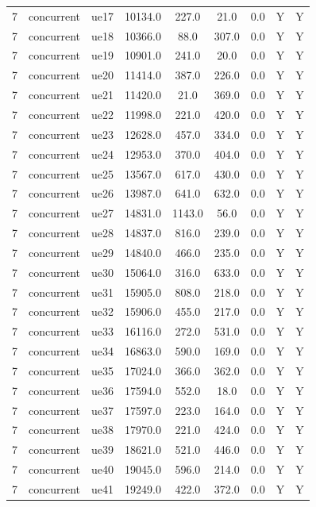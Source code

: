 \begin{table}[ht]
\begin{tabular}{|c|c|c|c|c|c|c|c|c|}
7 & concurrent & ue17 & 10134.0 & 227.0 & 21.0 & 0.0 & Y & Y \\
7 & concurrent & ue18 & 10366.0 & 88.0 & 307.0 & 0.0 & Y & Y \\
7 & concurrent & ue19 & 10901.0 & 241.0 & 20.0 & 0.0 & Y & Y \\
7 & concurrent & ue20 & 11414.0 & 387.0 & 226.0 & 0.0 & Y & Y \\
7 & concurrent & ue21 & 11420.0 & 21.0 & 369.0 & 0.0 & Y & Y \\
7 & concurrent & ue22 & 11998.0 & 221.0 & 420.0 & 0.0 & Y & Y \\
7 & concurrent & ue23 & 12628.0 & 457.0 & 334.0 & 0.0 & Y & Y \\
7 & concurrent & ue24 & 12953.0 & 370.0 & 404.0 & 0.0 & Y & Y \\
7 & concurrent & ue25 & 13567.0 & 617.0 & 430.0 & 0.0 & Y & Y \\
7 & concurrent & ue26 & 13987.0 & 641.0 & 632.0 & 0.0 & Y & Y \\
7 & concurrent & ue27 & 14831.0 & 1143.0 & 56.0 & 0.0 & Y & Y \\
7 & concurrent & ue28 & 14837.0 & 816.0 & 239.0 & 0.0 & Y & Y \\
7 & concurrent & ue29 & 14840.0 & 466.0 & 235.0 & 0.0 & Y & Y \\
7 & concurrent & ue30 & 15064.0 & 316.0 & 633.0 & 0.0 & Y & Y \\
7 & concurrent & ue31 & 15905.0 & 808.0 & 218.0 & 0.0 & Y & Y \\
7 & concurrent & ue32 & 15906.0 & 455.0 & 217.0 & 0.0 & Y & Y \\
7 & concurrent & ue33 & 16116.0 & 272.0 & 531.0 & 0.0 & Y & Y \\
7 & concurrent & ue34 & 16863.0 & 590.0 & 169.0 & 0.0 & Y & Y \\
7 & concurrent & ue35 & 17024.0 & 366.0 & 362.0 & 0.0 & Y & Y \\
7 & concurrent & ue36 & 17594.0 & 552.0 & 18.0 & 0.0 & Y & Y \\
7 & concurrent & ue37 & 17597.0 & 223.0 & 164.0 & 0.0 & Y & Y \\
7 & concurrent & ue38 & 17970.0 & 221.0 & 424.0 & 0.0 & Y & Y \\
7 & concurrent & ue39 & 18621.0 & 521.0 & 446.0 & 0.0 & Y & Y \\
7 & concurrent & ue40 & 19045.0 & 596.0 & 214.0 & 0.0 & Y & Y \\
7 & concurrent & ue41 & 19249.0 & 422.0 & 372.0 & 0.0 & Y & Y \\

\end{tabular}
\end{table}
